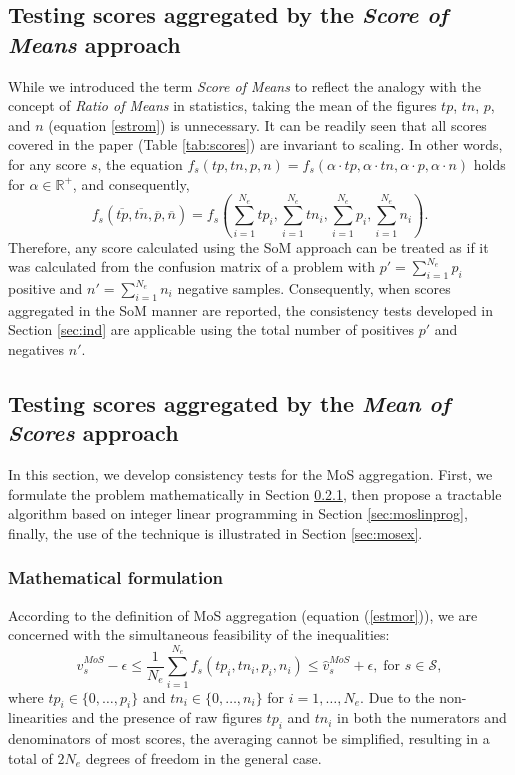 \documentclass[3p, times]{elsarticle}
\begin{document}
\subsection{Testing scores aggregated by the \emph{Score of Means} approach}
\label{sec:rom}

While we introduced the term \emph{Score of Means} to reflect the analogy with the concept of \emph{Ratio of Means} in statistics, taking the mean of the figures $tp$, $tn$, $p$, and $n$ (equation \ref{estrom}) is unnecessary. It can be readily seen that all scores covered in the paper (Table \ref{tab:scores}) are invariant to scaling. In other words, for any score $s$, the equation $f_s(tp, tn, p, n) = f_s(\alpha\cdot tp, \alpha\cdot tn, \alpha\cdot p, \alpha\cdot n)$ holds for $\alpha \in\mathbb{R}^{+}$, and consequently,
\begin{equation}
f_s(\overline{tp}, \overline{tn}, \overline{p}, \overline{n}) = f_s\left(\sum\limits_{i=1}^{N_e} tp_i, \sum\limits_{i=1}^{N_e} tn_i, \sum\limits_{i=1}^{N_e} p_i, \sum\limits_{i=1}^{N_e} n_i\right).
\end{equation}
Therefore, any score calculated using the SoM approach can be treated as if it was calculated from the confusion matrix of a problem with $p'=\sum\limits_{i=1}^{N_e} p_i$ positive and $n'=\sum\limits_{i=1}^{N_e} n_i$ negative samples. Consequently, when scores aggregated in the SoM manner are reported, the consistency tests developed in Section \ref{sec:ind} are applicable using the total number of positives $p'$ and negatives $n'$.

\subsection{Testing scores aggregated by the \emph{Mean of Scores} approach}
\label{sec:mor}

In this section, we develop consistency tests for the MoS aggregation. First, we formulate the problem mathematically in Section \ref{sec:mosmath}, then propose a tractable algorithm based on integer linear programming in Section \ref{sec:moslinprog}, finally, the use of the technique is illustrated in Section \ref{sec:mosex}.

\subsubsection{Mathematical formulation}
\label{sec:mosmath}
According to the definition of MoS aggregation (equation (\ref{estmor})), we are concerned with the simultaneous feasibility of the inequalities:
\begin{equation}
\label{nlopt}
\hat{v}_s^{MoS} - \epsilon \leq \dfrac{1}{N_e}\sum\limits_{i=1}^{N_e} f_s(tp_i, tn_i, p_i, n_i) \leq \hat{v}_s^{MoS} + \epsilon, \; \text{for } s \in \mathcal{S},
\end{equation}
where $tp_i \in \lbrace 0, \dots, p_i\rbrace$ and $tn_i \in \lbrace 0, \dots, n_i\rbrace$ for $i = 1, \dots, N_e$. Due to the non-linearities and the presence of raw figures $tp_i$ and $tn_i$ in both the numerators and denominators of most scores, the averaging cannot be simplified, resulting in a total of $2N_e$ degrees of freedom in the general case.
\end{document}
